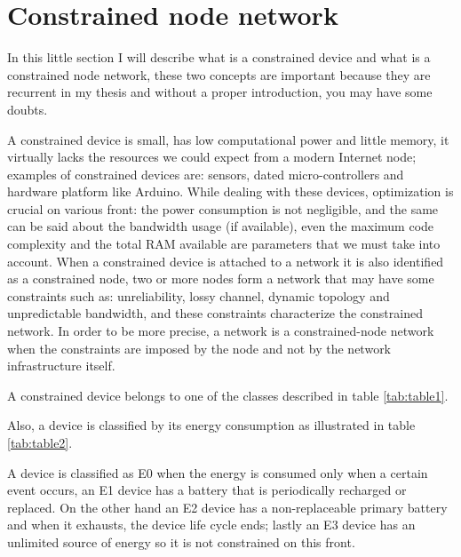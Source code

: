 	\section{Constrained node network}
	In this little section I will describe what is a constrained device and what is a constrained node network,
	these two concepts are important because they are recurrent in my thesis and without a proper introduction, you may have
	some doubts. \newline
	
	A constrained device is small, has low computational power and little memory, it virtually lacks the resources
	we could expect from a modern Internet node; examples of constrained devices are: sensors, dated micro-controllers and hardware platform like Arduino.\newline
	While dealing with these devices, optimization is crucial on various front: the power consumption is not negligible,
	and the same can be said about the bandwidth usage (if available), even the maximum code complexity and the total RAM available are parameters that we must take into account.\newline
	When a constrained device is attached to a network it is also identified as a constrained node, two or more nodes form a network that may have some constraints such as: unreliability, lossy channel, dynamic topology and unpredictable bandwidth, and these constraints characterize the constrained network.\newline
	In order to be more precise, a network is a constrained-node network when the constraints are imposed by the node
	and not by the network infrastructure itself.
	
	
	
	A constrained device belongs to one of the classes described in table \ref{tab:table1}.\newline
	
	
	Also, a device is classified by its energy consumption as illustrated in table \ref{tab:table2}.
	
	A device is classified as E0 when the energy is consumed only when a certain event occurs, an E1 device has a battery 
	that is periodically recharged or replaced.\newline
	On the other hand an E2 device has a non-replaceable primary battery and when it exhausts, the device life cycle ends; lastly an E3 device has an unlimited source of energy so it is not constrained on this front.\newline 
	
